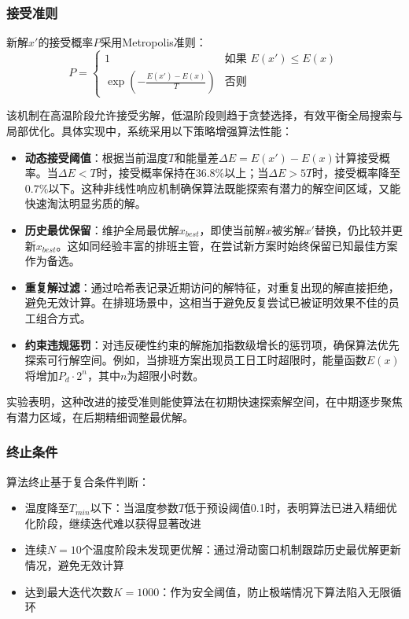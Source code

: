 \documentclass{ctexart}
\begin{document}
\subsubsection{接受准则}
新解$x'$的接受概率$P$采用Metropolis准则：
\begin{equation}
P = \begin{cases}
1 & \text{如果 } E(x') \leq E(x) \\
\exp\left(-\frac{E(x')-E(x)}{T}\right) & \text{否则}
\end{cases}
\end{equation}

该机制在高温阶段允许接受劣解，低温阶段则趋于贪婪选择，有效平衡全局搜索与局部优化。具体实现中，系统采用以下策略增强算法性能：

\begin{itemize}
    \item \textbf{动态接受阈值}：根据当前温度$T$和能量差$\Delta E = E(x')-E(x)$计算接受概率。当$\Delta E < T$时，接受概率保持在$36.8\%$以上；当$\Delta E > 5T$时，接受概率降至$0.7\%$以下。这种非线性响应机制确保算法既能探索有潜力的解空间区域，又能快速淘汰明显劣质的解。

    \item \textbf{历史最优保留}：维护全局最优解$x_{best}$，即使当前解$x$被劣解$x'$替换，仍比较并更新$x_{best}$。这如同经验丰富的排班主管，在尝试新方案时始终保留已知最佳方案作为备选。

    \item \textbf{重复解过滤}：通过哈希表记录近期访问的解特征，对重复出现的解直接拒绝，避免无效计算。在排班场景中，这相当于避免反复尝试已被证明效果不佳的员工组合方式。

    \item \textbf{约束违规惩罚}：对违反硬性约束的解施加指数级增长的惩罚项，确保算法优先探索可行解空间。例如，当排班方案出现员工日工时超限时，能量函数$E(x)$将增加$P_d \cdot 2^{n}$，其中$n$为超限小时数。
\end{itemize}

实验表明，这种改进的接受准则能使算法在初期快速探索解空间，在中期逐步聚焦有潜力区域，在后期精细调整最优解。

\subsubsection{终止条件}
算法终止基于复合条件判断：
\begin{itemize}
    \item 温度降至$T_{min}$以下：当温度参数$T$低于预设阈值0.1时，表明算法已进入精细优化阶段，继续迭代难以获得显著改进
    \item 连续$N=10$个温度阶段未发现更优解：通过滑动窗口机制跟踪历史最优解更新情况，避免无效计算
    \item 达到最大迭代次数$K=1000$：作为安全阈值，防止极端情况下算法陷入无限循环
\end{itemize}
\end{document}
